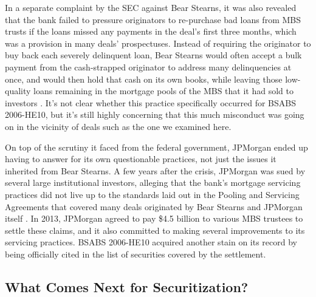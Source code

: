 \documentclass[12pt]{article}
\begin{document}
In a separate complaint by the SEC against Bear Stearns, it was also revealed that the bank failed to pressure originators to re-purchase bad loans from MBS trusts if the loans missed any payments in the deal’s first three months, which was a provision in many deals’ prospectuses. Instead of requiring the originator to buy back each severely delinquent loan, Bear Stearns would often accept a bulk payment from the cash-strapped originator to address many delinquencies at once, and would then hold that cash on its own books, while leaving those low-quality loans remaining in the mortgage pools of the MBS that it had sold to investors \parencite{sec13}. It's not clear whether this practice specifically occurred for BSABS 2006-HE10, but it’s still highly concerning that this much misconduct was going on in the vicinity of deals such as the one we examined here.

On top of the scrutiny it faced from the federal government, JPMorgan ended up having to answer for its own questionable practices, not just the issues it inherited from Bear Stearns. A few years after the crisis, JPMorgan was sued by several large institutional investors, alleging that the bank’s mortgage servicing practices did not live up to the standards laid out in the Pooling and Servicing Agreements that covered many deals originated by Bear Stearns and JPMorgan itself \parencite{gibbs13}. In 2013, JPMorgan agreed to pay \$4.5 billion to various MBS trustees to settle these claims, and it also committed to making several improvements to its servicing practices. BSABS 2006-HE10 acquired another stain on its record by being officially cited in the list of securities covered by the settlement.

\subsection*{What Comes Next for Securitization?}
\end{document}
